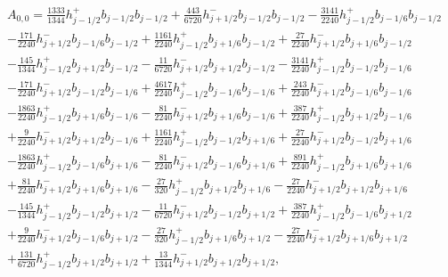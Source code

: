 \documentclass[12pt]{article}
\begin{document}
\begin{multline*} A_{0,0} = \frac{1333}{1344} h_{j-1/2}^+ b_{j-1/2} b_{j-1/2}+\frac{443}{6720} h_{j+1/2}^- b_{j-1/2} b_{j-1/2}-\frac{3141}{2240} h_{j-1/2}^+ b_{j-1/6} b_{j-1/2}\\-\frac{171}{2240} h_{j+1/2}^- b_{j-1/6} b_{j-1/2}+\frac{1161}{2240} h_{j-1/2}^+ b_{j+1/6} b_{j-1/2}+\frac{27}{2240} h_{j+1/2}^- b_{j+1/6} b_{j-1/2}\\-\frac{145}{1344} h_{j-1/2}^+ b_{j+1/2} b_{j-1/2}-\frac{11}{6720} h_{j+1/2}^- b_{j+1/2} b_{j-1/2}-\frac{3141}{2240} h_{j-1/2}^+ b_{j-1/2} b_{j-1/6}\\-\frac{171}{2240} h_{j+1/2}^- b_{j-1/2} b_{j-1/6}+\frac{4617}{2240} h_{j-1/2}^+ b_{j-1/6} b_{j-1/6}+\frac{243}{2240} h_{j+1/2}^- b_{j-1/6} b_{j-1/6}\\-\frac{1863}{2240} h_{j-1/2}^+ b_{j+1/6} b_{j-1/6}-\frac{81}{2240} h_{j+1/2}^- b_{j+1/6} b_{j-1/6}+\frac{387}{2240} h_{j-1/2}^+ b_{j+1/2} b_{j-1/6}\\+\frac{9}{2240} h_{j+1/2}^- b_{j+1/2} b_{j-1/6}+\frac{1161}{2240} h_{j-1/2}^+ b_{j-1/2} b_{j+1/6}+\frac{27}{2240} h_{j+1/2}^- b_{j-1/2} b_{j+1/6}\\-\frac{1863}{2240} h_{j-1/2}^+ b_{j-1/6} b_{j+1/6}-\frac{81}{2240} h_{j+1/2}^- b_{j-1/6} b_{j+1/6}+\frac{891}{2240} h_{j-1/2}^+ b_{j+1/6} b_{j+1/6}\\+\frac{81}{2240} h_{j+1/2}^- b_{j+1/6} b_{j+1/6}-\frac{27}{320} h_{j-1/2}^+ b_{j+1/2} b_{j+1/6}-\frac{27}{2240} h_{j+1/2}^- b_{j+1/2} b_{j+1/6}\\-\frac{145}{1344} h_{j-1/2}^+ b_{j-1/2} b_{j+1/2}-\frac{11}{6720} h_{j+1/2}^- b_{j-1/2} b_{j+1/2}+\frac{387}{2240} h_{j-1/2}^+ b_{j-1/6} b_{j+1/2}\\+\frac{9}{2240} h_{j+1/2}^- b_{j-1/6} b_{j+1/2}-\frac{27}{320} h_{j-1/2}^+ b_{j+1/6} b_{j+1/2}-\frac{27}{2240} h_{j+1/2}^- b_{j+1/6} b_{j+1/2}\\+\frac{131}{6720} h_{j-1/2}^+ b_{j+1/2} b_{j+1/2}+\frac{13}{1344} h_{j+1/2}^- b_{j+1/2} b_{j+1/2}, \end{multline*}
\end{document}
